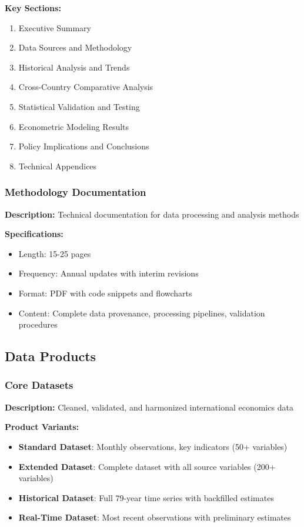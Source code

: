 \documentclass[11pt,a4paper]{article}
\begin{document}
\textbf{Key Sections:}
\begin{enumerate}
    \item Executive Summary
    \item Data Sources and Methodology
    \item Historical Analysis and Trends
    \item Cross-Country Comparative Analysis
    \item Statistical Validation and Testing
    \item Econometric Modeling Results
    \item Policy Implications and Conclusions
    \item Technical Appendices
\end{enumerate}

\subsubsection{Methodology Documentation}
\textbf{Description:} Technical documentation for data processing and analysis methods

\textbf{Specifications:}
\begin{itemize}
    \item Length: 15-25 pages
    \item Frequency: Annual updates with interim revisions
    \item Format: PDF with code snippets and flowcharts
    \item Content: Complete data provenance, processing pipelines, validation procedures
\end{itemize}

\subsection{Data Products}

\subsubsection{Core Datasets}
\textbf{Description:} Cleaned, validated, and harmonized international economics data

\textbf{Product Variants:}
\begin{itemize}
    \item \textbf{Standard Dataset}: Monthly observations, key indicators (50+ variables)
    \item \textbf{Extended Dataset}: Complete dataset with all source variables (200+ variables)
    \item \textbf{Historical Dataset}: Full 79-year time series with backfilled estimates
    \item \textbf{Real-Time Dataset}: Most recent observations with preliminary estimates
\end{itemize}
\end{document}
